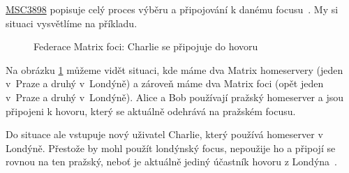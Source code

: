 \href{https://github.com/matrix-org/matrix-spec-proposals/pull/3898}{MSC3898}
popisuje celý proces výběru a připojování k danému focusu~\parencite{GitHub-MSC3898}.
My si situaci vysvětlíme na příkladu.

\begin{figure}[H]
    \centering
    \caption{Federace Matrix foci: Charlie se připojuje do hovoru}
    \label{focusSelection1}
\end{figure}

Na obrázku \ref{focusSelection1} můžeme vidět situaci, kde máme dva Matrix
homeservery (jeden v~Praze a druhý v~Londýně) a zároveň máme dva Matrix foci
(opět jeden v~Praze a druhý v~Londýně). Alice a Bob používají pražský homeserver
a jsou připojeni k hovoru, který se aktuálně odehrává na pražském focusu.

Do situace ale vstupuje nový uživatel Charlie, který používá homeserver v
Londýně. Přestože by mohl použít londýnský focus, nepoužije ho a připojí se
rovnou na ten pražský, neboť je aktuálně jediný účastník hovoru z
Londýna~\parencite{GitHub-MSC3898}.

